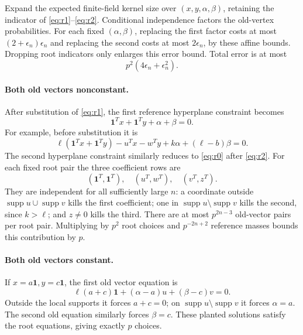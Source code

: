 \documentclass[11pt]{article}
\newcommand{\one}{\mathbf1}
\begin{document}
Expand the expected finite-field kernel size over $(x,y,\alpha,\beta)$, retaining the indicator of \eqref{eq:r1}--\eqref{eq:r2}. Conditional independence factors the old-vertex probabilities. For each fixed $(\alpha,\beta)$, replacing the first factor costs at most $(2+\epsilon_n)\epsilon_n$ and replacing the second costs at most $2\epsilon_n$, by these affine bounds. Dropping root indicators only enlarges this error bound. Total error is at most
\begin{equation}\label{eq:error}
 p^2(4\epsilon_n+\epsilon_n^2).
\end{equation}

\paragraph{Both old vectors nonconstant.}
After substitution of \eqref{eq:r1}, the first reference hyperplane constraint becomes
\begin{equation}\label{eq:r0}
 \one^Tx+\one^Ty+\alpha+\beta=0.
\end{equation}
For example, before substitution it is
\[
 \ell(\one^Tx+\one^Ty)-u^Tx-w^Ty+k\alpha+(\ell-b)\beta=0.
\]
The second hyperplane constraint similarly reduces to \eqref{eq:r0} after \eqref{eq:r2}. For each fixed root pair the three coefficient rows are
\[
 (\one^T,\one^T),\quad (u^T,w^T),\quad(v^T,z^T).
\]
They are independent for all sufficiently large $n$: a coordinate outside $\operatorname{supp}u\cup\operatorname{supp}v$ kills the first coefficient; one in $\operatorname{supp}u\setminus\operatorname{supp}v$ kills the second, since $k>\ell$; and $z\ne0$ kills the third. There are at most $p^{2n-3}$ old-vector pairs per root pair. Multiplying by $p^2$ root choices and $p^{-2n+2}$ reference masses bounds this contribution by $p$.

\paragraph{Both old vectors constant.}
If $x=a\one,y=c\one$, the first old vector equation is
\[
 \ell(a+c)\one+(\alpha-a)u+(\beta-c)v=0.
\]
Outside the local supports it forces $a+c=0$; on $\operatorname{supp}u\setminus\operatorname{supp}v$ it forces $\alpha=a$. The second old equation similarly forces $\beta=c$. These planted solutions satisfy the root equations, giving exactly $p$ choices.
\end{document}
